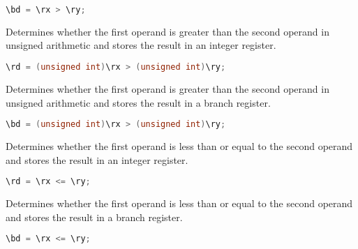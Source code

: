 \begin{lstlisting}[numbers=none, basicstyle=\ttfamily\footnotesize, language=C++]
\bd = \rx > \ry;
\end{lstlisting}

Determines whether the first operand is greater than the second operand in
unsigned arithmetic and stores the result in an integer register.

\begin{lstlisting}[numbers=none, basicstyle=\ttfamily\footnotesize, language=C++]
\rd = (unsigned int)\rx > (unsigned int)\ry;
\end{lstlisting}

Determines whether the first operand is greater than the second operand in
unsigned arithmetic and stores the result in a branch register.

\begin{lstlisting}[numbers=none, basicstyle=\ttfamily\footnotesize, language=C++]
\bd = (unsigned int)\rx > (unsigned int)\ry;
\end{lstlisting}

Determines whether the first operand is less than or equal to the second
operand and stores the result in an integer register.

\begin{lstlisting}[numbers=none, basicstyle=\ttfamily\footnotesize, language=C++]
\rd = \rx <= \ry;
\end{lstlisting}

Determines whether the first operand is less than or equal to the second
operand and stores the result in a branch register.

\begin{lstlisting}[numbers=none, basicstyle=\ttfamily\footnotesize, language=C++]
\bd = \rx <= \ry;
\end{lstlisting}

